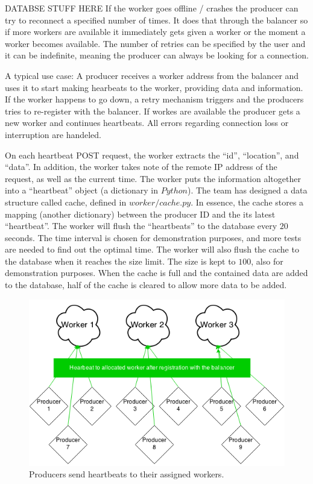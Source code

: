 \documentclass{sigchi}
\begin{document}
DATABSE STUFF HERE
If the worker goes offline / crashes the producer can try to reconnect a specified number of times. It does that through the balancer so if more workers are available it immediately gets given a worker or the moment a worker becomes available. The number of retries can be specified by the user and it can be indefinite, meaning the producer can always be looking for a connection.

A typical use case:
A producer receives a worker address from the balancer and uses it to start making hearbeats to the worker, providing data and information. If the worker happens to go down, a retry mechanism triggers and the producers tries to re-register with the balancer. If workes are available the producer gets a new worker and continues heartbeats. All errors regarding connection loss or interruption are handeled.

On each heartbeat POST request, the worker extracts the \enquote{id}, \enquote{location}, and \enquote{data}. In addition, the worker takes note of the remote IP address of the request, as well as the current time. The worker puts the information altogether into a \enquote{heartbeat} object (a dictionary in $Python$). The team has designed a data structure called cache, defined in $worker/cache.py$. In essence, the cache stores a mapping (another dictionary) between the producer ID and the its latest \enquote{heartbeat}. The worker will flush the \enquote{heartbeats} to the database every $20$ seconds. The time interval is chosen for demonstration purposes, and more tests are needed to find out the optimal time. The worker will also flush the cache to the database when it reaches the size limit. The size is kept to $100$, also for demonstration purposes. When the cache is full and the contained data are added to the database, half of the cache is cleared to allow more data to be added.

\begin{figure}[!h]
\centering
\includegraphics[width=0.9\columnwidth]{img/heartbeat}
\caption{Producers send heartbeats to their assigned workers.}
\label{fig:heartbeat}
\end{figure}
\end{document}
